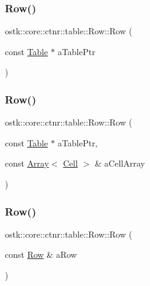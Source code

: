 \subsubsection{\texorpdfstring{Row()}{Row()}\hspace{0.1cm}{\footnotesize\ttfamily [3/5]}}
{\footnotesize\ttfamily ostk\+::core\+::ctnr\+::table\+::\+Row\+::\+Row (\begin{DoxyParamCaption}\item[{const \hyperlink{classostk_1_1core_1_1ctnr_1_1_table}{Table} $\ast$}]{a\+Table\+Ptr }\end{DoxyParamCaption})}

\mbox{\label{classostk_1_1core_1_1ctnr_1_1table_1_1_row_a1e9c6bf33e7f7b4656677e6fac08a205}} 
\subsubsection{\texorpdfstring{Row()}{Row()}\hspace{0.1cm}{\footnotesize\ttfamily [4/5]}}
{\footnotesize\ttfamily ostk\+::core\+::ctnr\+::table\+::\+Row\+::\+Row (\begin{DoxyParamCaption}\item[{const \hyperlink{classostk_1_1core_1_1ctnr_1_1_table}{Table} $\ast$}]{a\+Table\+Ptr,  }\item[{const \hyperlink{classostk_1_1core_1_1ctnr_1_1_array}{Array}$<$ \hyperlink{namespaceostk_1_1core_1_1ctnr_1_1table_a697fb8eda17fde15703741a0c49036b9}{Cell} $>$ \&}]{a\+Cell\+Array }\end{DoxyParamCaption})}

\mbox{\label{classostk_1_1core_1_1ctnr_1_1table_1_1_row_aa5b738f8504f61c4b43aebebbcce9938}} 
\subsubsection{\texorpdfstring{Row()}{Row()}\hspace{0.1cm}{\footnotesize\ttfamily [5/5]}}
{\footnotesize\ttfamily ostk\+::core\+::ctnr\+::table\+::\+Row\+::\+Row (\begin{DoxyParamCaption}\item[{const \hyperlink{classostk_1_1core_1_1ctnr_1_1table_1_1_row}{Row} \&}]{a\+Row }\end{DoxyParamCaption})}



